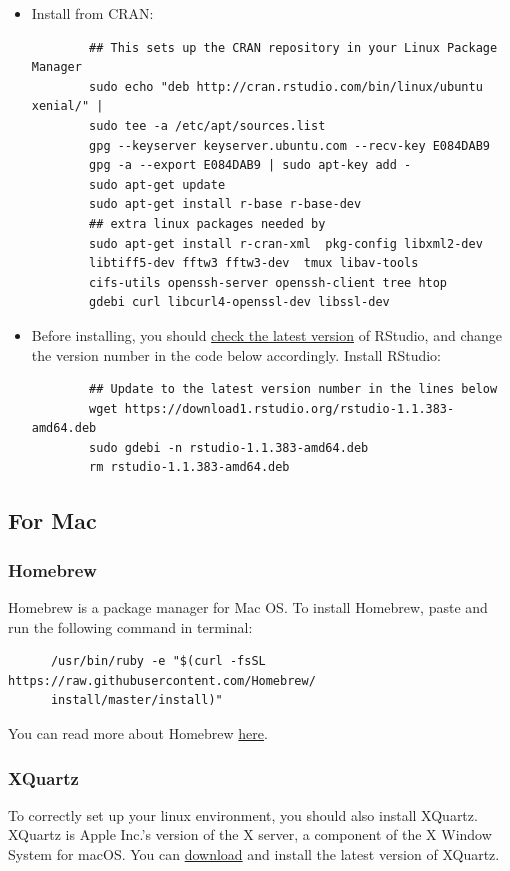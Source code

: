 \documentclass[11pt]{article} %
\begin{document}
    \begin{itemize}
    	\item Install from CRAN:
    	\begin{lstlisting}
    	## This sets up the CRAN repository in your Linux Package Manager
    	sudo echo "deb http://cran.rstudio.com/bin/linux/ubuntu xenial/" | 
    	sudo tee -a /etc/apt/sources.list
    	gpg --keyserver keyserver.ubuntu.com --recv-key E084DAB9
    	gpg -a --export E084DAB9 | sudo apt-key add -
    	sudo apt-get update
    	sudo apt-get install r-base r-base-dev
    	## extra linux packages needed by
    	sudo apt-get install r-cran-xml  pkg-config libxml2-dev
    	libtiff5-dev fftw3 fftw3-dev  tmux libav-tools
    	cifs-utils openssh-server openssh-client tree htop
    	gdebi curl libcurl4-openssl-dev libssl-dev
    	\end{lstlisting}
    	\item Before installing, you should \href{https://www.rstudio.com/products/rstudio/download/}{check the latest version} of RStudio, and change the version number in the code below accordingly. 
      Install RStudio:
    	\begin{lstlisting} 
    	## Update to the latest version number in the lines below
    	wget https://download1.rstudio.org/rstudio-1.1.383-amd64.deb
    	sudo gdebi -n rstudio-1.1.383-amd64.deb
    	rm rstudio-1.1.383-amd64.deb
    	\end{lstlisting}
    
    \end{itemize}
  
  \subsection{For Mac}
  
    \subsubsection{Homebrew}
      Homebrew is a package manager for Mac OS. 
      To install Homebrew, paste and run the following command in terminal:
      \begin{lstlisting}
      /usr/bin/ruby -e "$(curl -fsSL https://raw.githubusercontent.com/Homebrew/
      install/master/install)"
      \end{lstlisting}
      You can read more about Homebrew \href{https://brew.sh/}{here}.
    
    \subsubsection{XQuartz}
      To correctly set up your linux environment, you should also install XQuartz.
      XQuartz is Apple Inc.'s version of the X server, a component of the X Window System for macOS. 
      You can \href{https://www.xquartz.org/}{download} and install the latest version of XQuartz. 
    
\end{document}

